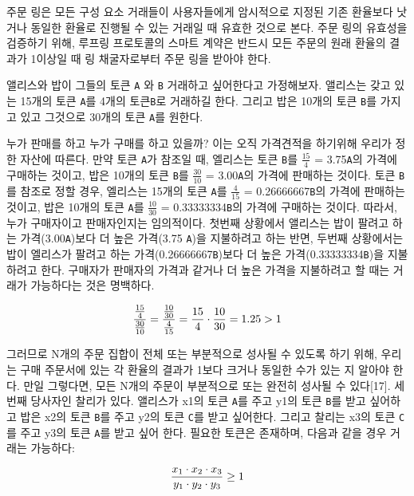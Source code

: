 \documentclass{article}
\begin{document}
\begin{multicols}{2}
주문 링은 모든 구성 요소 거래들이 사용자들에게 암시적으로 지정된 기존 환율보다 낫거나 동일한 환율로 진행될 수 있는 거래일 때 유효한 것으로 본다. 주문 링의 유효성을 검증하기 위해, 루프링 프로토콜의 스마트 계약은 반드시 모든 주문의 원래 환율의 결과가 1이상일 때 링 채굴자로부터 주문 링을 받아야 한다.

앨리스와 밥이 그들의 토큰  \verb|A| 와 \verb|B| 거래하고 싶어한다고 가정해보자. 앨리스는 갖고 있는 15개의 토큰  \verb|A|를 4개의 토큰\verb|B|로 거래하길 한다. 그리고 밥은 10개의 토큰 \verb|B|를 가지고 있고 그것으로 30개의 토큰 \verb|A|를 원한다.

누가 판매를 하고 누가 구매를 하고 있을까? 이는 오직 가격견적을 하기위해 우리가 정한 자산에 따른다. 만약 토큰 \verb|A|가 참조일 때, 엘리스는 토큰 \verb|B|를 $\frac{15}{4}$ = 3.75\verb|A|의 가격에 구매하는 것이고, 밥은 10개의 토큰 \verb|B|를 $\frac{30}{10}$ = 3.00\verb|A|의 가격에 판매하는 것이다. 토큰 \verb|B|를 참조로 정할 경우, 엘리스는 15개의 토큰 \verb|A|를 $\frac{4}{15}$ = 0.26666667\verb|B|의 가격에 판매하는 것이고, 밥은 10개의 토큰 \verb|A|를 $\frac{10}{30}$ = 0.33333334\verb|B|의 가격에 구매하는 것이다. 따라서, 누가 구매자이고 판매자인지는 임의적이다. 
첫번째 상황에서 앨리스는 밥이 팔려고 하는 가격(3.00\verb|A|)보다 더 높은 가격(3.75 \verb|A|)을 지불하려고 하는 반면, 두번째 상황에서는 밥이 엘리스가 팔려고 하는 가격(0.26666667\verb|B|)보다 더 높은 가격(0.33333334\verb|B|)을 지불하려고 한다. 구매자가 판매자의 가격과 같거나 더 높은 가격을 지불하려고 할 때는 거래가 가능하다는 것은 명백하다.

\begin{equation}
{{15\over 4} \over {30\over 10}} = {{10\over 30} \over {4\over 15}}={15 \over 4} \cdot {10 \over 30} = 1.25 > 1
\end{equation}

그러므로 N개의 주문 집합이 전체 또는 부분적으로 성사될 수 있도록 하기 위해, 우리는 구매 주문서에 있는 각 환율의 결과가 1보다 크거나 동일한 수가 있는 지 알아야 한다. 만일 그렇다면, 모든 N개의 주문이 부분적으로 또는 완전히 성사될 수 있다[17].
세번째 당사자인 찰리가 있다. 앨리스가 x1의 토큰 \verb|A|를 주고 y1의 토큰 \verb|B|를 받고 싶어하고 밥은 x2의 토큰 \verb|B|를 주고 y2의 토큰 \verb|C|를 받고 싶어한다. 그리고 찰리는 x3의 토큰 \verb|C|를 주고 y3의 토큰 \verb|A|를 받고 싶어 한다. 필요한 토큰은 존재하며, 다음과 같을 경우 거래는 가능하다:

\begin{equation}
	{{x_1 \cdot x_2 \cdot x_3 \over y_1 \cdot y_2 \cdot y_3}\geq 1}
\end{equation}


\end{multicols}
\end{document}

